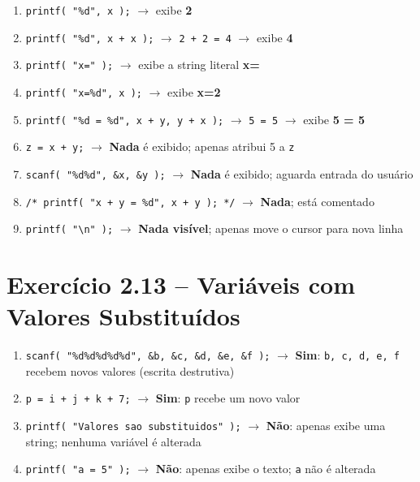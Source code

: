 \documentclass[12pt,a4paper]{article}
\begin{document}
\begin{respostabox}
\begin{enumerate}[label=\textbf{\alph*)}]
\item \texttt{printf( "\%d", x );} $\to$ exibe \textbf{2}
\item \texttt{printf( "\%d", x + x );} $\to$ \texttt{2 + 2 = 4} $\to$ exibe \textbf{4}
\item \texttt{printf( "x=" );} $\to$ exibe a string literal \textbf{x=}
\item \texttt{printf( "x=\%d", x );} $\to$ exibe \textbf{x=2}
\item \texttt{printf( "\%d = \%d", x + y, y + x );} $\to$ \texttt{5 = 5} $\to$ exibe \textbf{5 = 5}
\item \texttt{z = x + y;} $\to$ \textbf{Nada} é exibido; apenas atribui 5 a \texttt{z}
\item \texttt{scanf( "\%d\%d", \&x, \&y );} $\to$ \textbf{Nada} é exibido; aguarda entrada do usuário
\item \texttt{/* printf( "x + y = \%d", x + y ); */} $\to$ \textbf{Nada}; está comentado
\item \texttt{printf( "\textbackslash n" );} $\to$ \textbf{Nada visível}; apenas move o cursor para nova linha
\end{enumerate}
\end{respostabox}

\section{Exercício 2.13 -- Variáveis com Valores Substituídos}

\begin{respostabox}[title={Exercício 2.13}]
\begin{enumerate}[label=\textbf{\alph*)}]
\item \texttt{scanf( "\%d\%d\%d\%d\%d", \&b, \&c, \&d, \&e, \&f );} $\to$
  \textbf{Sim}: \texttt{b, c, d, e, f} recebem novos valores (escrita destrutiva)
\item \texttt{p = i + j + k + 7;} $\to$
  \textbf{Sim}: \texttt{p} recebe um novo valor
\item \texttt{printf( "Valores sao substituidos" );} $\to$
  \textbf{Não}: apenas exibe uma string; nenhuma variável é alterada
\item \texttt{printf( "a = 5" );} $\to$
  \textbf{Não}: apenas exibe o texto; \texttt{a} não é alterada
\end{enumerate}
\end{respostabox}
\end{document}
